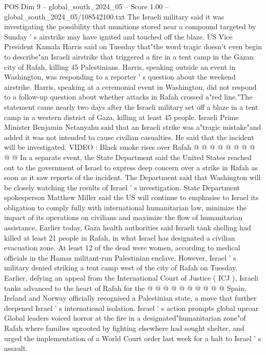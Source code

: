 \begin{textsample}{POS Dim 9 – global\_south\_2024\_05 – Score 1.00 – global\_south\_2024\_05/108542100.txt}  \label{ex:f9_pos_123}
The Israeli military said it was investigating the possibility that munitions stored near a compound targeted by Sunday ' s airstrike may have ignited and touched off the blaze.
US Vice President Kamala Harris said on Tuesday that"the word tragic doesn't even begin to describe"an Israeli airstrike that triggered a fire in a tent camp in the Gazan city of Rafah, killing 45 Palestinians.
Harris, speaking outside an event in Washington, was responding to a reporter ' s question about the weekend airstrike.
Harris, speaking at a ceremonial event in Washington, did not respond to a follow-up question about whether attacks in Rafah crossed a"red line."The statement came nearly two days after the Israeli military set off a blaze in a tent camp in a western district of Gaza, killing at least 45 people.
Israeli Prime Minister Benjamin Netanyahu said that an Israeli strike was a"tragic mistake"and added it was not intended to cause civilian casualties.
He said that the incident will be investigated.
VIDEO : Black smoke rises over Rafah @ @ @ @ @ @ @ @ @ @ In a separate event, the State Department said the United States reached out to the government of Israel to express deep concern over a strike in Rafah as soon as it saw reports of the incident.
The Department said that Washington will be closely watching the results of Israel ' s investigation.
State Department spokesperson Matthew Miller said the US will continue to emphasise to Israel its obligation to comply fully with international humanitarian law, minimize the impact of its operations on civilians and maximize the flow of humanitarian assistance.
Earlier today, Gaza health authorities said Israeli tank shelling had killed at least 21 people in Rafah, in what Israel has designated a civilian evacuation zone.
At least 12 of the dead were women, according to medical officials in the Hamas militant-run Palestinian enclave.
However, Israel ' s military denied striking a tent camp west of the city of Rafah on Tuesday.
Earlier, defying an appeal from the International Court of Justice ( ICJ ), Israeli tanks advanced to the heart of Rafah for the @ @ @ @ @ @ @ @ @ @ Spain, Ireland and Norway officially recognised a Palestinian state, a move that further deepened Israel ' s international isolation.
Israel ' s action prompts global uproar Global leaders voiced horror at the fire in a designated"humanitarian zone"of Rafah where families uprooted by fighting elsewhere had sought shelter, and urged the implementation of a World Court order last week for a halt to Israel ' s assault.

\end{textsample}
